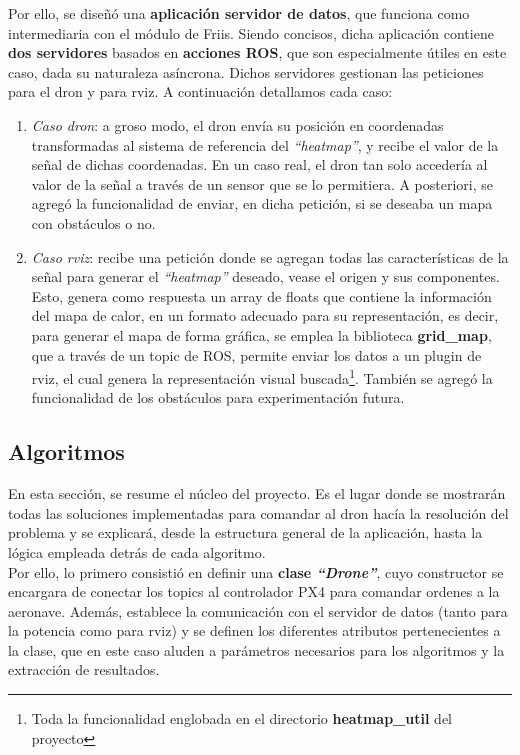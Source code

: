 Por ello, se diseñó una \textbf{aplicación servidor de datos}, que funciona como intermediaria con el módulo de Friis. Siendo concisos, dicha aplicación contiene \textbf{dos servidores} basados en \textbf{acciones \ac{ROS}}, que son especialmente útiles en este caso, dada su naturaleza asíncrona. Dichos servidores gestionan las peticiones para el dron y para rviz. A continuación detallamos cada caso:

\begin{enumerate}
	\item \emph{Caso dron}: a groso modo, el dron envía su posición en coordenadas transformadas al sistema de referencia del \emph{``heatmap''}, y recibe el valor de la señal de dichas coordenadas. En un caso real, el dron tan solo accedería al valor de la señal a través de un sensor que se lo permitiera. A posteriori, se agregó la funcionalidad de enviar, en dicha petición, si se deseaba un mapa con obstáculos o no.

	\item \emph{Caso rviz}: recibe una petición donde se agregan todas las características de la señal para generar el \emph{``heatmap''} deseado, vease el origen y sus componentes. Esto, genera como respuesta un array de floats que contiene la información del mapa de calor, en un formato adecuado para su representación, es decir, para generar el mapa de forma gráfica, se emplea la biblioteca \textbf{grid\_map}, que a través de un topic de \ac{ROS}, permite enviar los datos a un plugin de rviz, el cual genera la representación visual buscada\footnote[2]{Toda la funcionalidad englobada en el directorio \textbf{heatmap\_util} del proyecto}. También se agregó la funcionalidad de los obstáculos para experimentación futura.
\end{enumerate}
\newpage
\subsection{Algoritmos}
\label{subsec:algoritmos}

En esta sección, se resume el núcleo del proyecto. Es el lugar donde se mostrarán todas las soluciones implementadas para comandar al dron hacía la resolución del problema y se explicará, desde la estructura general de la aplicación, hasta la lógica empleada detrás de cada algoritmo.\\

Por ello, lo primero consistió en definir una \textbf{clase \emph{``Drone''}}, cuyo constructor se encargara de conectar los topics al controlador PX4 para comandar ordenes a la aeronave. Además, establece la comunicación con el servidor de datos (tanto para la potencia como para rviz) y se definen los diferentes atributos pertenecientes a la clase, que en este caso aluden a parámetros necesarios para los algoritmos y la extracción de resultados.\\

